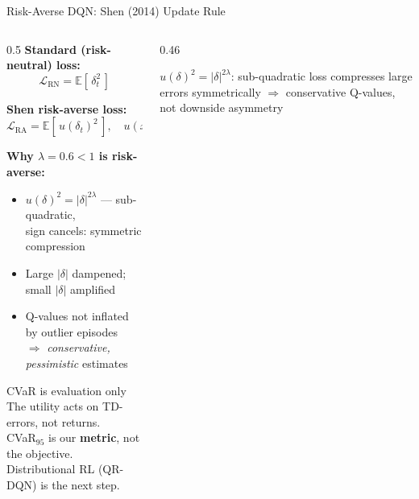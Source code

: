 \documentclass[aspectratio=169, 10pt]{beamer}
\begin{document}
\begin{frame}{Risk-Averse DQN: Shen (2014) Update Rule}
  \begin{columns}[T]
    \begin{column}{0.5\textwidth}
      \textbf{Standard (risk-neutral) loss:}
      $$\mathcal{L}_{\text{RN}} = \mathbb{E}[\,\delta_t^2\,]$$

      \textbf{Shen risk-averse loss:}
      $$\mathcal{L}_{\text{RA}} = \mathbb{E}[\,u(\delta_t)^2\,],\quad u(x) = \operatorname{sgn}(x)|x|^\lambda$$

      \textbf{Why $\lambda{=}0.6<1$ is risk-averse:}
      \begin{itemize}
        \item $u(\delta)^2 = |\delta|^{2\lambda}$ — sub-quadratic,\\
              sign cancels: \alert{symmetric} compression
        \item Large $|\delta|$ dampened; small $|\delta|$ amplified
        \item Q-values not inflated by outlier episodes\\
              $\Rightarrow$ \emph{conservative, pessimistic} estimates
      \end{itemize}

      \begin{alertblock}{CVaR is evaluation only}
        \small The utility acts on TD-errors, not returns.\\
        CVaR$_{95}$ is our \textbf{metric}, not the objective.\\
        Distributional RL (QR-DQN) is the next step.
      \end{alertblock}
    \end{column}
    \begin{column}{0.46\textwidth}
      \centering

      \smallskip
      \footnotesize
      $u(\delta)^2 = |\delta|^{2\lambda}$: sub-quadratic loss compresses large errors symmetrically $\Rightarrow$ conservative Q-values, not downside asymmetry
    \end{column}
  \end{columns}
\end{frame}
\end{document}
